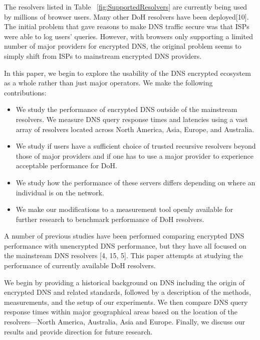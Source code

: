 The resolvers listed in Table ~\ref{fig:SupportedResolvers} are currently being used by millions of browser users.
Many other DoH resolvers have been deployed[10].
The initial problem that gave reasons to make DNS traffic secure was that ISPs were able to log users' queries.
However, with browsers only supporting a limited number of major providers for encrypted DNS, the original problem seems to simply shift from ISPs to mainstream encrypted DNS providers.

In this paper, we begin to explore the usability of the DNS encrypted ecosystem as a whole rather than just major operators. We make the following contributions:
\begin{itemize}
\setlength\itemsep{0em}
\item We study the performance of encrypted DNS outside of the mainstream resolvers. We measure DNS query response times and latencies using a vast array of resolvers located across North America, Asia, Europe, and Australia. 
\item We study if users have a sufficient choice of trusted recursive resolvers beyond those of major providers and if one has to use a major provider to experience acceptable performance for DoH. 
\item We study how the performance of these servers differs depending on where an individual is on the network.
\item We make our modifications to a measurement tool openly available for further research to benchmark performance of DoH resolvers.
\end{itemize}

A number of previous studies have been performed comparing encrypted DNS performance with unencrypted DNS performance, but they have all focused on the mainstream DNS resolvers [4, 15, 5].
This paper attempts at studying the performance of currently available DoH resolvers.

We begin by providing a historical background on DNS including the origin of encrypted DNS and related standards, followed by a description of the methods, measurements, and the setup of our experiments.
We then compare DNS query response times within major geographical areas based on the location of the resolvers—North America, Australia, Asia and Europe.
Finally, we discuss our results and provide direction for future research.